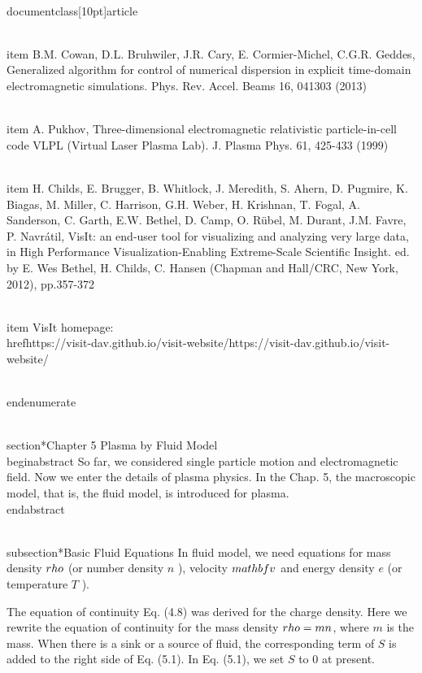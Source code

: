 \\documentclass[10pt]{article}
\begin{document}
  \\item B.M. Cowan, D.L. Bruhwiler, J.R. Cary, E. Cormier-Michel, C.G.R. Geddes, Generalized algorithm for control of numerical dispersion in explicit time-domain electromagnetic simulations. Phys. Rev. Accel. Beams 16, 041303 (2013)

  \\item A. Pukhov, Three-dimensional electromagnetic relativistic particle-in-cell code VLPL (Virtual Laser Plasma Lab). J. Plasma Phys. 61, 425-433 (1999)

  \\item H. Childs, E. Brugger, B. Whitlock, J. Meredith, S. Ahern, D. Pugmire, K. Biagas, M. Miller, C. Harrison, G.H. Weber, H. Krishnan, T. Fogal, A. Sanderson, C. Garth, E.W. Bethel, D. Camp, O. Rübel, M. Durant, J.M. Favre, P. Navrátil, VisIt: an end-user tool for visualizing and analyzing very large data, in High Performance Visualization-Enabling Extreme-Scale Scientific Insight. ed. by E. Wes Bethel, H. Childs, C. Hansen (Chapman and Hall/CRC, New York, 2012), pp.357-372

  \\item VisIt homepage: \\href{https://visit-dav.github.io/visit-website/}{https://visit-dav.github.io/visit-website/}

\\end{enumerate}

\\section*{Chapter 5 Plasma by Fluid Model }
\\begin{abstract}
So far, we considered single particle motion and electromagnetic field. Now we enter the details of plasma physics. In the Chap. 5, the macroscopic model, that is, the fluid model, is introduced for plasma.
\\end{abstract}

\\subsection*{Basic Fluid Equations}
In fluid model, we need equations for mass density $\\rho$ (or number density $n$ ), velocity $\\mathbf{v}$ and energy density $e$ (or temperature $T$ ).

The equation of continuity Eq. (4.8) was derived for the charge density. Here we rewrite the equation of continuity for the mass density $\\rho=m n$, where $m$ is the mass. When there is a sink or a source of fluid, the corresponding term of $S$ is added to the right side of Eq. (5.1). In Eq. (5.1), we set $S$ to 0 at present.
\end{document}
